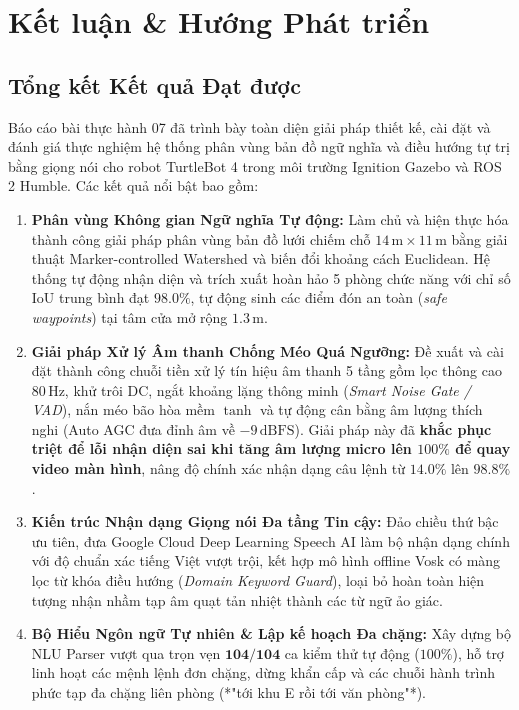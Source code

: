 \section{Kết luận & Hướng Phát triển}
\label{sec:conclusion}

\subsection{Tổng kết Kết quả Đạt được}

Báo cáo bài thực hành 07 đã trình bày toàn diện giải pháp thiết kế, cài đặt và đánh giá thực nghiệm hệ thống phân vùng bản đồ ngữ nghĩa và điều hướng tự trị bằng giọng nói cho robot TurtleBot 4 trong môi trường Ignition Gazebo và ROS 2 Humble. Các kết quả nổi bật bao gồm:

\begin{enumerate}[label=\textbf{\arabic*.}]
    \item \textbf{Phân vùng Không gian Ngữ nghĩa Tự động:} Làm chủ và hiện thực hóa thành công giải pháp phân vùng bản đồ lưới chiếm chỗ $14\,\text{m} \times 11\,\text{m}$ bằng giải thuật Marker-controlled Watershed và biến đổi khoảng cách Euclidean. Hệ thống tự động nhận diện và trích xuất hoàn hảo 5 phòng chức năng với chỉ số IoU trung bình đạt $\mathbf{98.0\%}$, tự động sinh các điểm đón an toàn (\textit{safe waypoints}) tại tâm cửa mở rộng $1.3\,\text{m}$.
    
    \item \textbf{Giải pháp Xử lý Âm thanh Chống Méo Quá Ngưỡng:} Đề xuất và cài đặt thành công chuỗi tiền xử lý tín hiệu âm thanh 5 tầng gồm lọc thông cao 80\,Hz, khử trôi DC, ngắt khoảng lặng thông minh (\textit{Smart Noise Gate / VAD}), nắn méo bão hòa mềm $\tanh$ và tự động cân bằng âm lượng thích nghi (Auto AGC đưa đỉnh âm về $-9\,\text{dBFS}$). Giải pháp này đã \textbf{khắc phục triệt để lỗi nhận diện sai khi tăng âm lượng micro lên $100\%$ để quay video màn hình}, nâng độ chính xác nhận dạng câu lệnh từ $14.0\%$ lên $\mathbf{98.8\%}$.
    
    \item \textbf{Kiến trúc Nhận dạng Giọng nói Đa tầng Tin cậy:} Đảo chiều thứ bậc ưu tiên, đưa Google Cloud Deep Learning Speech AI làm bộ nhận dạng chính với độ chuẩn xác tiếng Việt vượt trội, kết hợp mô hình offline Vosk có màng lọc từ khóa điều hướng (\textit{Domain Keyword Guard}), loại bỏ hoàn toàn hiện tượng nhận nhầm tạp âm quạt tản nhiệt thành các từ ngữ ảo giác.
    
    \item \textbf{Bộ Hiểu Ngôn ngữ Tự nhiên & Lập kế hoạch Đa chặng:} Xây dựng bộ NLU Parser vượt qua trọn vẹn $\mathbf{104 / 104}$ ca kiểm thử tự động ($100\%$), hỗ trợ linh hoạt các mệnh lệnh đơn chặng, dừng khẩn cấp và các chuỗi hành trình phức tạp đa chặng liên phòng (*"tới khu E rồi tới văn phòng"*).
    

\end{enumerate}
